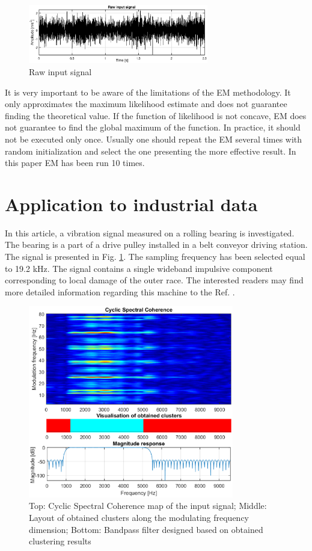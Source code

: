 \documentclass[10pt]{article}
\begin{document}
\begin{figure}[ht!]
\centering
\includegraphics[width=0.7\textwidth]{wykresy/raw.eps}
\caption{Raw input signal}
\label{fig:raw}
\end{figure}
It is very important to be aware of the limitations of the EM methodology. It only approximates the maximum likelihood estimate and does not guarantee finding the theoretical value. If the function of likelihood is not concave, EM does not guarantee to find the global maximum of the function. In practice, it should not be executed only once. Usually one should repeat the EM several times with random initialization and select the one presenting the more effective result. In this paper EM has been run 10 times.

\section{Application to industrial data}
In this article, a vibration signal measured on a rolling bearing is investigated. The bearing is a part of a drive pulley installed in a belt conveyor driving station. The signal is presented in Fig. \ref{fig:raw}. The sampling frequency has been selected equal to 19.2 kHz. The signal contains a single wideband impulsive component corresponding to local damage of the outer race.  The interested readers may find more detailed information regarding this machine to the Ref. \cite{wodecki2018optimal}.

\begin{figure}[ht!]
\centering
\includegraphics[width=0.8\textwidth]{wykresy/cluster.eps}
\caption{Top: Cyclic Spectral Coherence map of the input signal; Middle: Layout of obtained clusters along the modulating frequency dimension; Bottom: Bandpass filter designed based on obtained clustering results}
\label{fig:cluster}
\end{figure}
\end{document}
